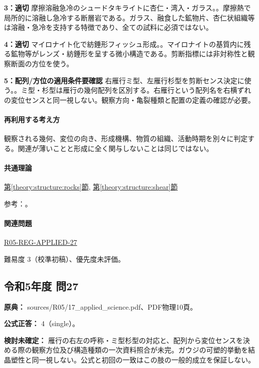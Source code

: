 \noindent\textbf{3：適切} 摩擦溶融急冷のシュードタキライトに杏仁・湾入・ガラス。。摩擦熱で局所的に溶融し急冷する断層岩である。ガラス、融食した鉱物片、杏仁状組織等は溶融・急冷を支持する特徴であり、全ての試料に必須ではない。\par

\noindent\textbf{4：適切} マイロナイト化で紡錘形フィッシュ形成。。マイロナイトの基質内に残る鉱物等がレンズ・紡錘形を呈する微小構造である。剪断指標には非対称性と観察断面の方位を使う。\par

\noindent\textbf{5：配列/方位の適用条件要確認} 右雁行ミ型、左雁行杉型を剪断センス決定に使う。。ミ型・杉型は雁行の幾何配列を区別する。右雁行という配列名を右横ずれの変位センスと同一視しない。観察方向・亀裂種類と配置の定義の確認が必要。\par

\paragraph{再利用する考え方} 観察される幾何、変位の向き、形成機構、物質の組織、活動時期を別々に判定する。関連が薄いことと形成に全く関与しないことは同じではない。

\paragraph{共通理論} \hyperref[theory:structure:rocks]{第\ref*{theory:structure:rocks}節}, \hyperref[theory:structure:shear]{第\ref*{theory:structure:shear}節}

\par 参考：\cite{str_faultrocks,str_shear}。

\paragraph{関連問題} \hyperref[q:r05-reg-applied-27]{R05-REG-APPLIED-27}

\par 難易度 3（校準初稿）、優先度未評価。

\subsection{令和5年度 問27}
\label{q:r05-reg-applied-27}

\noindent\textbf{原典：} sources/R05/17\_applied\_science.pdf、PDF物理10頁。

\textbf{公式正答：} 4（single）。

\par\textbf{検討未確定：} 雁行の右左の呼称・ミ型杉型の対応と、配列から変位センスを決める際の観察方位及び構造種類の一次資料照合が未完。ガウジの可塑的挙動を結晶塑性と同一視しない。公式と初回の一致はこの肢の一般的成立を保証しない。


